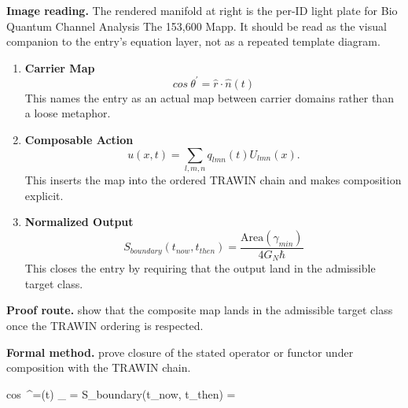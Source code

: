 \begin{samepage}
\noindent\begin{minipage}[t]{0.45\linewidth}
\vspace{0pt}
\raggedright
\scriptsize\textbf{Image reading.} The rendered manifold at right is the per-ID light plate for Bio Quantum Channel Analysis The 153,600 Mapp. It should be read as the visual companion to the entry's equation layer, not as a repeated template diagram.\par
\end{minipage}\hfill
\begin{minipage}[t]{0.53\linewidth}
\vspace*{-0.10in}
\raggedright
{}
\end{minipage}
\end{samepage}

\clearpage


\begin{enumerate}[leftmargin=1.6em,itemsep=9pt,topsep=6pt]
\item \textbf{Carrier Map}
\[
cos~\theta^{\prime}=\hat{r}\cdot\hat{n}(t)
\]
This names the entry as an actual map between carrier domains rather than a loose metaphor.

\item \textbf{Composable Action}
\[
u(x,t)=\sum_{l,m,n}q_{lmn}(t)U_{lmn}(x).
\]
This inserts the map into the ordered TRAWIN chain and makes composition explicit.

\item \textbf{Normalized Output}
\[
S_{boundary}(t_{now}, t_{then}) = \frac{\text{Area}(\gamma_{min})}{4 G_N \hbar}
\]
This closes the entry by requiring that the output land in the admissible target class.
\end{enumerate}

\textbf{Proof route.} show that the composite map lands in the admissible target class once the TRAWIN ordering is respected.

\textbf{Formal method.} prove closure of the stated operator or functor under composition with the TRAWIN chain.

\medskip
{}

\begin{tzpsnapshot}
\end{tzpsnapshot}

\tzpequationlinks
  {cos~\theta^{\prime}=\cdot{}(t)}
  {_{} = \cdots}
  {S_{boundary}(t_{now}, t_{then}) = }

